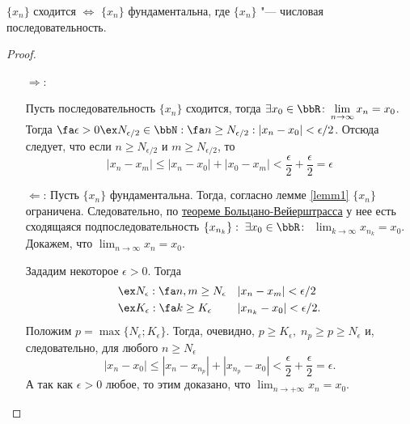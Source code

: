 \begin{thm} 
$\{x_n\}$ сходится $\Longleftrightarrow$ $\{x_n\}$ фундаментальна, где $\{x_n\}$ "--- числовая последовательность.
\end{thm}
\begin{proof}\leavevmode
\begin{itemize}
\item[$\Longrightarrow$:]

Пусть последовательность $\{x_n\}$ сходится, тогда $\exists x_{0} \in \bbR\colon  \lim_{n \to \infty}\limits x_n = x_0$. Тогда $\\ \fa \epsilon > 0 \ex N_{\epsilon/2} \in \bbN: \fa n \ge N_{\epsilon/2} : |x_n-x_0|<\epsilon/2$. Отсюда следует, что если $n \ge N_{\epsilon/2}$ и $m \ge N_{\epsilon/2}$, то
$$
|x_n-x_m| \le |x_n-x_0|+|x_0-x_m| <\frac{\epsilon}{2}+\frac{\epsilon}{2}=\epsilon
$$

\item[$\Longleftarrow$:]
Пусть $\{x_n\}$ фундаментальна. Тогда, согласно лемме \ref{lemm1} $\{x_n\}$ ограничена. Следовательно, по \hyperref[exp9]{теореме Больцано-Вейерштрасса} у нее есть сходящаяся подпоследовательность $\{x_{n_k}\}: \;\exists x_0 \in \bbR\colon$ $\lim_{k \to \infty}\limits x_{n_k} =x_0 $. Докажем, что $\lim_{n \to \infty}\limits x_{n}=x_0 $.

Зададим некоторое $\epsilon > 0$. Тогда
\begin{gather*}
\begin{aligned}
& \ex N_\epsilon : \fa n,m \ge N_\epsilon &&|x_n-x_m|<\epsilon/2\\
& \ex K_\epsilon : \fa k \ge K_\epsilon   &&|x_{n_k}-x_0|<\epsilon/2.
\end{aligned}
\end{gather*}
Положим $p=\max\{N_\epsilon;K_\epsilon\}$. Тогда, очевидно, $p \ge K_\epsilon,\; n_p \ge p \ge N_\epsilon$ и, следовательно, для любого $n \ge N_\epsilon$
$$
|x_n-x_0| \le |x_n-x_{n_p}|+|x_{n_p}-x_0|<\frac{\epsilon}{2}+\frac{\epsilon}{2}=\epsilon.
$$
А так как $\epsilon > 0$ любое, то этим доказано, что $\lim_{n \to +\infty}\limits x_n = x_0$. \qedhere
\end{itemize}
\end{proof}
